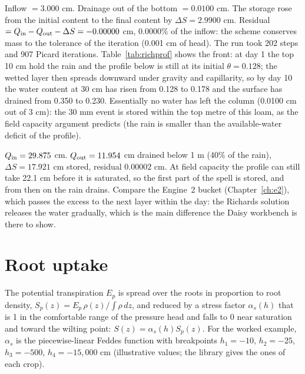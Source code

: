 \sol  Inflow $=3.000$ cm. Drainage out of the bottom $=0.0100$ cm. The storage rose from the initial content to the final content by $\Delta S=2.9900$ cm. Residual $=Q_{\rm in}-Q_{\rm out}-\Delta S=-0.00000$ cm, 0.0000\% of the inflow: the scheme conserves mass to the tolerance of the iteration (0.001 cm of head). The run took 202 steps and 907 Picard iterations. Table~\ref{tab:richprof} shows the front: at day 1 the top 10 cm hold the rain and the profile below is still at its initial $\theta=0.128$; the wetted layer then spreads downward under gravity and capillarity, so by day 10 the water content at 30 cm has risen from 0.128 to 0.178 and the surface has drained from 0.350 to 0.230. Essentially no water has left the column (0.0100 cm out of 3 cm): the 30 mm event is stored within the top metre of this loam, as the field capacity argument predicts (the rain is smaller than the available-water deficit of the profile).


\sol  $Q_{\rm in}=29.875$ cm. $Q_{\rm out}=11.954$ cm drained below 1 m (40\% of the rain), $\Delta S=17.921$ cm stored, residual $0.00002$ cm. At field capacity the profile can still take 22.1 cm before it is saturated, so the first part of the spell is stored, and from then on the rain drains. Compare the Engine~2 bucket (Chapter~\ref{ch:e2}), which passes the excess to the next layer within the day: the Richards solution releases the water gradually, which is the main difference the Daisy workbench is there to show.


\section{Root uptake}
The potential transpiration $E_p$ is spread over the roots in proportion to root density, $S_p(z)=E_p\,\rho(z)/\int\rho\,dz$, and reduced by a stress factor $\alpha_s(h)$ that is 1 in the comfortable range of the pressure head and falls to 0 near saturation and toward the wilting point: $S(z)=\alpha_s(h)S_p(z)$. For the worked example, $\alpha_s$ is the piecewise-linear Feddes function with breakpoints $h_1=-10$, $h_2=-25$, $h_3=-500$, $h_4=-15{,}000$ cm (illustrative values; the library gives the ones of each crop).

